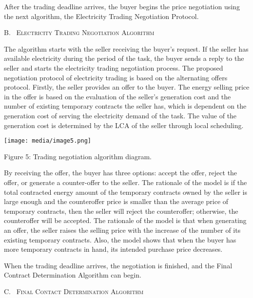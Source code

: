 \documentclass[
]{article}
\begin{document}
After the trading deadline arrives, the buyer begins the price
negotiation using the next algorithm, the Electricity Trading
Negotiation Protocol.

B.~ \textsc{Electricity Trading Negotiation Algorithm}

The algorithm starts with the seller receiving the buyer's request. If
the seller has available electricity during the period of the task, the
buyer sends a reply to the seller and starts the electricity trading
negotiation process. The proposed negotiation protocol of electricity
trading is based on the alternating offers protocol. Firstly, the seller
provides an offer to the buyer. The energy selling price in the offer is
based on the evaluation of the seller's generation cost and the number
of existing temporary contracts the seller has, which is dependent on
the generation cost of serving the electricity demand of the task. The
value of the generation cost is determined by the LCA of the seller
through local scheduling.

\texttt{[image: media/image5.png]}

Figure 5: Trading negotiation algorithm diagram.

By receiving the offer, the buyer has three options: accept the offer,
reject the offer, or generate a counter-offer to the seller. The
rationale of the model is if the total contracted energy amount of the
temporary contracts owned by the seller is large enough and the
counteroffer price is smaller than the average price of temporary
contracts, then the seller will reject the counteroffer; otherwise, the
counteroffer will be accepted. The rationale of the model is that when
generating an offer, the seller raises the selling price with the
increase of the number of its existing temporary contracts. Also, the
model shows that when the buyer has more temporary contracts in hand,
its intended purchase price decreases.

When the trading deadline arrives, the negotiation is finished, and the
Final Contract Determination Algorithm can begin.

C.~ \textsc{Final Contact Determination Algorithm}
\end{document}
